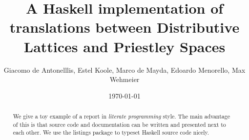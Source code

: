 \documentclass[12pt,a4paper]{article}
\title{A Haskell implementation of translations between Distributive Lattices and Priestley Spaces}
\author{Giacomo de Antonelllis, Estel Koole, Marco de Mayda, Edoardo Menorello, Max Wehmeier}
\date{\today}
\begin{document}
\maketitle

\begin{abstract}
We give a toy example of a report in \emph{literate programming} style.
The main advantage of this is that source code and documentation can
be written and presented next to each other.
We use the listings package to typeset Haskell source code nicely.
\end{abstract}

\vfill

\tableofcontents

\clearpage


















\end{document}
